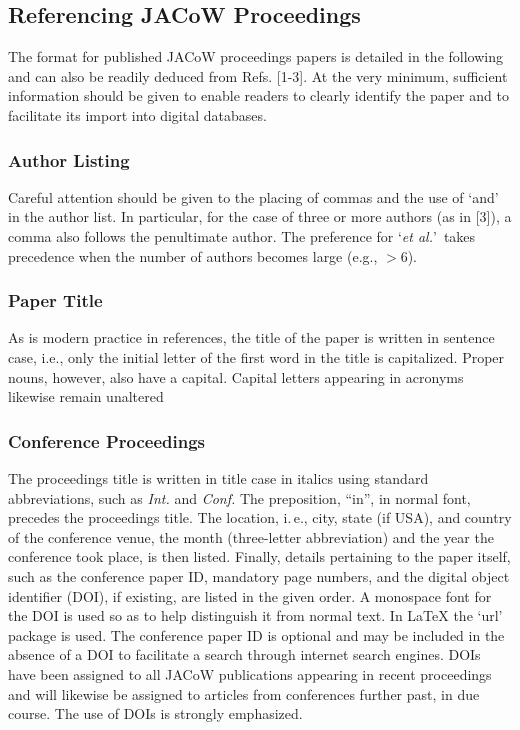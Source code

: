 \subsection{Referencing JACoW Proceedings}

The format for published JACoW proceedings papers is detailed in the following 
and can also be readily deduced from Refs. [1-3]. At the very minimum, sufficient 
information should be given to enable readers to clearly identify the paper and 
to facilitate its import into digital databases.
\vspace*{-.6\baselineskip}

\subsubsection{Author Listing} Careful attention should be given to the
placing of commas and the use of ‘and’ in the author list.
In particular, for the case of three or more authors
(as in [3]), a comma also follows the penultimate author.
The preference for ‘\emph{et al.}’\ takes precedence when the number
of authors becomes large (e.g., $>$6).
\vspace*{-.6\baselineskip}

\subsubsection{Paper Title} As is modern practice in references, the title
of the paper is written in sentence case, i.e., only the
initial letter of the first word in the title is capitalized.
Proper nouns, however, also have a capital. Capital letters
appearing in acronyms likewise remain unaltered
\vspace*{-.6\baselineskip}

\subsubsection{Conference Proceedings} The proceedings title is
written in title case in italics using standard abbreviations,
such as \emph{Int.} and \emph{Conf.} The preposition, ``in'', in normal
font, precedes the proceedings title. The location,
i.\,e., city, state (if USA), and country of the conference
venue, the month (three-letter abbreviation) and the year
the conference took place, is then listed. Finally, details
pertaining to the paper itself, such as the conference paper
ID, mandatory page numbers, and the digital object
identifier (DOI), if existing, are listed in the given order.
A monospace font for the DOI is used so as to help
distinguish it from normal text. In \LaTeX{}
the ‘url’ package is used. The conference
paper ID is optional and may be included in the absence
of a DOI to facilitate a search through internet search
engines. DOIs have been assigned to all JACoW
publications appearing in recent proceedings and will
likewise be assigned to articles from conferences further
past, in due course. The use of DOIs is strongly
emphasized.

